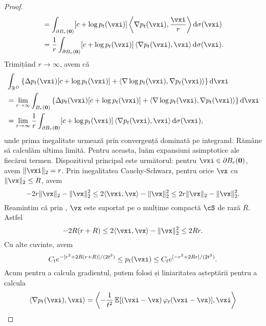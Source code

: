 \documentclass[../../book-main_ro.tex]{subfiles}
\begin{document}
\begin{proof}
\begin{align}
        &= \int_{\partial B_{r}(\vzero)}[c + \log p_{t}(\vxi)]\ip*{\nabla p_{t}(\vxi)}{\frac{\vxi}{r}}\odif{\sigma(\vxi)} \\
        &= \frac{1}{r}\int_{\partial B_{r}(\vzero)}[c + \log p_{t}(\vxi)]\ip*{\nabla p_{t}(\vxi)}{\vxi}\odif{\sigma(\vxi)}.
    \end{align}
    Trimițând \(r \to \infty\), avem că 
    \begin{align}
        &\int_{\R^{D}}\bc{\Delta p_{t}(\vxi)[c + \log p_{t}(\vxi)] + \ip{\nabla \log p_{t}(\vxi)}{\nabla p_{t}(\vxi)}}\odif{\vxi} \label{eq:app_diffusion_r_infinity_limit} \\
        &= \lim_{r \to \infty}\int_{B_{r}(\vzero)}\bc{\Delta p_{t}(\vxi)[c + \log p_{t}(\vxi)] + \ip{\nabla \log p_{t}(\vxi)}{\nabla p_{t}(\vxi)}}\odif{\vxi} \\
        &= \lim_{r \to \infty}\frac{1}{r}\int_{\partial B_{r}(\vzero)}[c + \log p_{t}(\vxi)]\ip*{\nabla p_{t}(\vxi)}{\vxi}\odif{\sigma(\vxi)},
    \end{align}
    unde prima inegalitate urmează prin convergență dominată pe integrand. Rămâne să calculăm ultima limită. Pentru aceasta, luăm expansiuni asimptotice ale fiecărui termen. Dispozitivul principal este următorul: pentru \(\vxi \in \partial B_{r}(\vzero)\), avem \(\norm{\vxi}_{2} = r\). Prin inegalitatea Cauchy-Schwarz, pentru orice \(\vx\) cu \(\norm{\vx}_{2} \leq R\), avem
    \begin{equation}
        -2r\norm{\vx}_{2} - \norm{\vx}_{2}^{2} \leq 2\ip{\vxi}{\vx} - \norm{\vx}_{2}^{2} \leq 2r\norm{\vx}_{2} - \norm{\vx}_{2}^{2}.
    \end{equation}
    Reamintim că prin , \(\vx\) este suportat pe o mulțime compactă \(\cS\) de rază \(R\). Astfel
    \begin{equation}
        -2R(r + R) \leq 2\ip{\vxi}{\vx} - \norm{\vx}_{2}^{2} \leq 2Rr.
    \end{equation}
    Cu alte cuvinte, avem
    \begin{equation}
        C_{t}e^{-[r^{2} + 2R(r + R)]/(2t^{2})} \leq p_{t}(\vxi) \leq C_{t}e^{[-r^{2} + 2Rr]/(2t^{2})}.
    \end{equation}
    Acum pentru a calcula gradientul, putem folosi  și liniaritatea așteptării pentru a calcula
    \begin{align}
        \ip{\nabla p_{t}(\vxi)}{\vxi}
        &= \ip*{-\frac{1}{t^{2}}\Ex\rs{\bp{\vxi - \vx}\phi_{t}(\vxi - \vx)}}{\vxi} \\

\end{align}
\end{proof}
\end{document}
